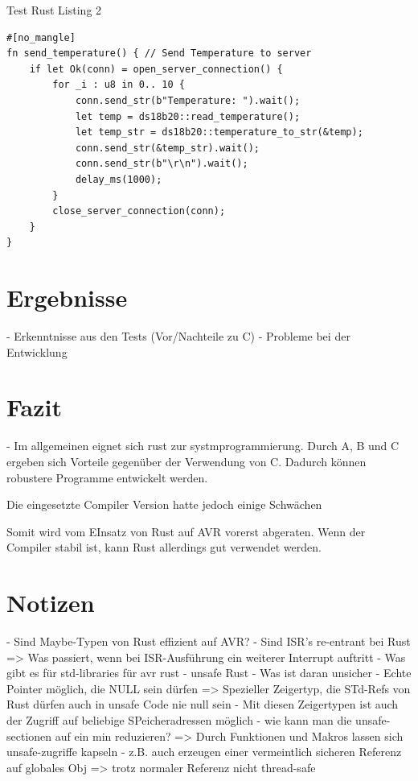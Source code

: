 \documentclass
[ 12pt,
  parskip=half %
]{scrreprt}
\newenvironment{mylisting}[1][H]
{\captionsetup{aboveskip=-0.2\normalbaselineskip}\begin{listing}[#1]}
	{\end{listing}}
\begin{document}
\begin{mylisting}[H]
	\caption{Test Rust Listing 2}
	\begin{verbatim}
#[no_mangle]
fn send_temperature() { // Send Temperature to server
	if let Ok(conn) = open_server_connection() {
		for _i : u8 in 0.. 10 {
			conn.send_str(b"Temperature: ").wait();
			let temp = ds18b20::read_temperature();
			let temp_str = ds18b20::temperature_to_str(&temp);
			conn.send_str(&temp_str).wait();
			conn.send_str(b"\r\n").wait();
			delay_ms(1000);
		}
		close_server_connection(conn);
	}
}
	\end{verbatim}
\end{mylisting} 

\chapter{Ergebnisse}
- Erkenntnisse aus den Tests
	(Vor/Nachteile zu C)
- Probleme bei der Entwicklung 


\chapter{Fazit}

- Im allgemeinen eignet sich rust zur systmprogrammierung. Durch A, B und C ergeben sich Vorteile gegenüber der Verwendung von C. Dadurch können robustere Programme entwickelt werden.

Die eingesetzte Compiler Version hatte jedoch einige Schwächen

Somit wird vom EInsatz von Rust auf AVR vorerst abgeraten. Wenn der Compiler stabil ist, kann Rust allerdings gut verwendet werden.

\chapter{Notizen}

- Sind Maybe-Typen von Rust effizient auf AVR?
- Sind ISR's re-entrant bei Rust
	=> Was passiert, wenn bei ISR-Ausführung ein weiterer Interrupt auftritt
- Was gibt es für std-libraries für avr rust
- unsafe Rust
	- Was ist daran unsicher
		- Echte Pointer möglich, die NULL sein dürfen
			=> Spezieller Zeigertyp, die STd-Refs von Rust dürfen auch in unsafe Code nie null sein
		- Mit diesen Zeigertypen ist auch der Zugriff auf beliebige SPeicheradressen möglich
	- wie kann man die unsafe-sectionen auf ein min reduzieren?
	=> Durch Funktionen und Makros lassen sich unsafe-zugriffe kapseln
	- z.B. auch erzeugen einer vermeintlich sicheren Referenz auf globales Obj
		=> trotz normaler Referenz nicht thread-safe
	
\end{document}
